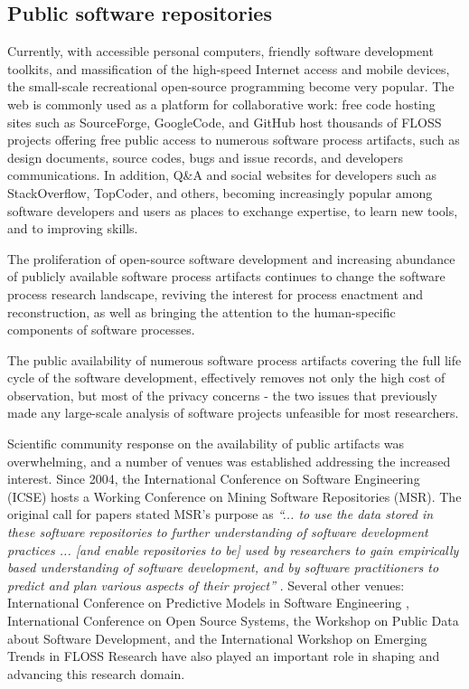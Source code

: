 \subsection{Public software repositories}
Currently, with accessible personal computers, friendly software development toolkits, and massification of 
the high-speed Internet access and mobile devices, the small-scale recreational open-source programming 
become very popular. 
The web is commonly used as a platform for collaborative work: free code hosting sites such as SourceForge, 
GoogleCode, and GitHub host thousands of FLOSS projects offering free public access to numerous software 
process artifacts, such as design documents, source codes, bugs and issue records, and developers communications.
In addition, Q\&A and social websites for developers such as StackOverflow, TopCoder, and others, becoming 
increasingly popular among software developers and users as places to exchange expertise, to learn new tools, 
and to improving skills.

The proliferation of open-source software development and increasing abundance of publicly available 
software process artifacts continues to change the software process research landscape,
reviving the interest for process enactment and reconstruction, as well as bringing the attention to the 
human-specific components of software processes. 

The public availability of numerous software process artifacts covering the full life cycle of the software
development, effectively removes not only the high cost of observation, but most of the privacy concerns - 
the two issues that previously made any large-scale analysis of software projects unfeasible for most researchers.

Scientific community response on the availability of public artifacts was overwhelming, and a number of 
venues was established addressing the increased interest. 
Since 2004, the International Conference on Software Engineering (ICSE) hosts a Working Conference on 
Mining Software Repositories (MSR). The original call for papers stated MSR's purpose as 
\textit{``... to use the data stored in these software repositories to further understanding of software 
development practices ... [and enable repositories to be] used by researchers to gain empirically based 
understanding of software development, and by software practitioners to predict and plan various aspects 
of their project''} \cite{msr2004} \cite{citeulike:7853299}. 
Several other venues: International Conference on Predictive Models in Software Engineering \cite{promise12}, 
International Conference on Open Source Systems, the Workshop on Public Data about Software Development, 
and the International Workshop on Emerging Trends in FLOSS Research have also played
an important role in shaping and advancing this research domain.

